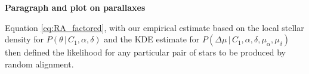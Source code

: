 \documentclass[usenatbib]{mnras}
\newcommand{\given}{\,|\,}
\newcommand{\dd}{\mathrm{d}}
\begin{document}
{\bf Paragraph and plot on parallaxes}
\begin{comment}
The last two integrals in Equation \ref{eq:RA_factored} account for uncertainties in each of the astrometric parallax measurements. We assume that Lutz-Kelker bias \citep{lutz73} needs to be taken into account, therefore:
\begin{equation}
P(\pi) \propto \pi^4.
\end{equation}
Observational uncertainties on the parallax are assumed to be Gaussian:
\begin{equation}
P(\pi' \given \pi) = \mathcal{N}(\pi'; \pi, \sigma_{\pi}). 
\end{equation}
\end {comment}


Equation \ref{eq:RA_factored}, with our empirical estimate based on the local stellar density for $P(\theta \given C_1, \alpha, \delta)$ and the KDE estimate for $P(\Delta \mu \given C_1, \alpha, \delta, \mu_{\alpha}, \mu_{\delta})$ then defined the likelihood for any particular pair of stars to be produced by random alignment.



\begin{comment}
With a detailed knowledge of the three-dimensional stellar density, proper motion distribution as a function of spatial position, and completeness function of the Gaia-TYCHO-2 sample, one could determine $P(\theta, \Delta \mu, \Delta D' \given C_1, \alpha, \delta, \mu_{\alpha}, \mu_{\delta}, D )$ for any arbitrary pair of stars. However, this is a function with complex dependencies that we are not prepared to address here. Instead, we can empirically approximate this probability for every pair of stars in our data set. First, we express $\mu$ as $V_{\rm pec}$ (to remove the correlation between proper motion and distance), and then separate the terms in the probability:
\begin{eqnarray}
P(\theta, \Delta \mu, \Delta D' \given C_1, \alpha, \delta, \mu_{\alpha}, \mu_{\delta}, D ) &=& P(\theta, \Delta V_{\rm pec}, \Delta D' \given C_1, \alpha, \delta, \mu_{\alpha}, \mu_{\delta}, D ) \left| \frac{\dd \Delta V_{\rm pec}}{\dd \Delta \mu} \right| \label{eq:P_obs_noise} \\
&=& P(\theta \given \alpha, \delta) 
  P(\Delta V_{\rm pec} \given \alpha, \delta, \mu_{\alpha}, \mu_{\delta}) \nonumber \\
  & & \qquad \times  P(\Delta D' \given \alpha, \delta, D) \left| \frac{\dd \Delta V_{\rm pec}}{\dd \Delta \mu} \right|. \label{eq:P_obs_noise_split} 
\end{eqnarray}


\end{comment}
\end{document}
